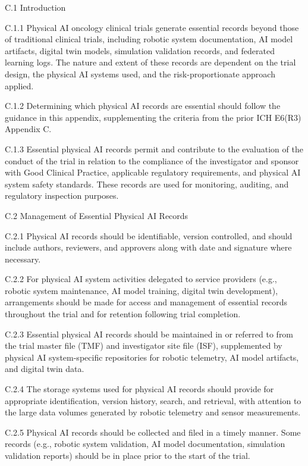 C.1 Introduction

C.1.1 Physical AI oncology clinical trials generate essential records beyond those of traditional clinical trials, including robotic system documentation, AI model artifacts, digital twin models, simulation validation records, and federated learning logs. The nature and extent of these records are dependent on the trial design, the physical AI systems used, and the risk-proportionate approach applied.

C.1.2 Determining which physical AI records are essential should follow the guidance in this appendix, supplementing the criteria from the prior ICH E6(R3) Appendix C.

C.1.3 Essential physical AI records permit and contribute to the evaluation of the conduct of the trial in relation to the compliance of the investigator and sponsor with Good Clinical Practice, applicable regulatory requirements, and physical AI system safety standards. These records are used for monitoring, auditing, and regulatory inspection purposes.

C.2 Management of Essential Physical AI Records

C.2.1 Physical AI records should be identifiable, version controlled, and should include authors, reviewers, and approvers along with date and signature where necessary.

C.2.2 For physical AI system activities delegated to service providers (e.g., robotic system maintenance, AI model training, digital twin development), arrangements should be made for access and management of essential records throughout the trial and for retention following trial completion.

C.2.3 Essential physical AI records should be maintained in or referred to from the trial master file (TMF) and investigator site file (ISF), supplemented by physical AI system-specific repositories for robotic telemetry, AI model artifacts, and digital twin data.

C.2.4 The storage systems used for physical AI records should provide for appropriate identification, version history, search, and retrieval, with attention to the large data volumes generated by robotic telemetry and sensor measurements.

C.2.5 Physical AI records should be collected and filed in a timely manner. Some records (e.g., robotic system validation, AI model documentation, simulation validation reports) should be in place prior to the start of the trial.

